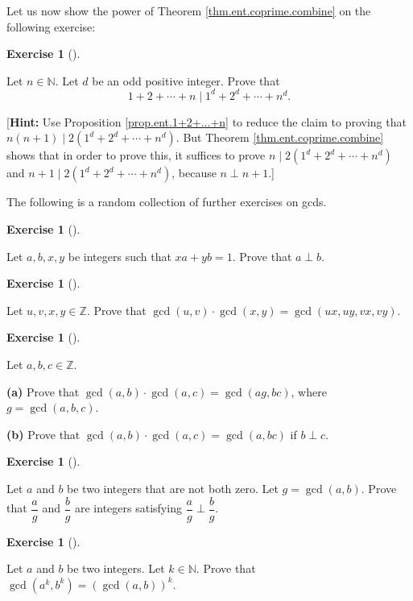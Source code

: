 \documentclass[numbers=enddot,12pt,final,onecolumn,notitlepage]{scrartcl}%
\newcounter{exer}
\numberwithin{exer}{subsection}
\theoremstyle{definition}
\newtheorem{exmp}[exer]{Exercise}
\newenvironment{exercise}[1][]
{\begin{exmp}[#1]\begin{leftbar}}
{\end{leftbar}\end{exmp}}
\begin{document}
Let us now show the power of Theorem \ref{thm.ent.coprime.combine} on the
following exercise:

\begin{exercise}
\label{exe.ent.coprime.1+2+...+n}Let $n\in\mathbb{N}$. Let $d$ be an odd
positive integer. Prove that%
\[
1+2+\cdots+n\mid1^{d}+2^{d}+\cdots+n^{d}.
\]


[\textbf{Hint:} Use Proposition \ref{prop.ent.1+2+...+n} to reduce the claim
to proving that $n\left(  n+1\right)  \mid2\left(  1^{d}+2^{d}+\cdots
+n^{d}\right)  $. But Theorem \ref{thm.ent.coprime.combine} shows that in
order to prove this, it suffices to prove $n\mid2\left(  1^{d}+2^{d}%
+\cdots+n^{d}\right)  $ and $n+1\mid2\left(  1^{d}+2^{d}+\cdots+n^{d}\right)
$, because $n\perp n+1$.]
\end{exercise}

The following is a random collection of further exercises on gcds.

\begin{exercise}
\label{exe.ent.coprime.bezout-conv} Let $a,b,x,y$ be integers such that
$xa+yb=1$. Prove that $a\perp b$.
\end{exercise}

\begin{exercise}
\label{exe.ent.coprime.gcdgcd1}Let $u,v,x,y\in\mathbb{Z}$. Prove that
$\gcd\left(  u,v\right)  \cdot\gcd\left(  x,y\right)  =\gcd\left(
ux,uy,vx,vy\right)  $.
\end{exercise}

\begin{exercise}
\label{exe.ent.coprime.gcdgcd2}Let $a,b,c\in\mathbb{Z}$.

\textbf{(a)} Prove that $\gcd\left(  a,b\right)  \cdot\gcd\left(  a,c\right)
=\gcd\left(  ag,bc\right)  $, where $g=\gcd\left(  a,b,c\right)  $.

\textbf{(b)} Prove that $\gcd\left(  a,b\right)  \cdot\gcd\left(  a,c\right)
=\gcd\left(  a,bc\right)  $ if $b\perp c$.
\end{exercise}

\begin{exercise}
\label{exe.ent.coprime.a/g}Let $a$ and $b$ be two integers that are not both
zero. Let $g=\gcd\left(  a,b\right)  $. Prove that $\dfrac{a}{g}$ and
$\dfrac{b}{g}$ are integers satisfying $\dfrac{a}{g}\perp\dfrac{b}{g}$.
\end{exercise}

\begin{exercise}
\label{exe.ent.gcd.akbk}Let $a$ and $b$ be two integers. Let $k\in\mathbb{N}$.
Prove that $\gcd\left(  a^{k},b^{k}\right)  =\left(  \gcd\left(  a,b\right)
\right)  ^{k}$.
\end{exercise}
\end{document}
